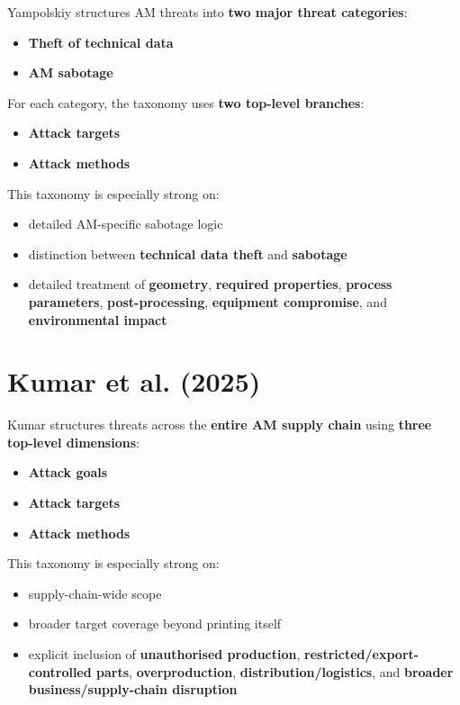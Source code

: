 \documentclass[10pt,a4paper,oneside]{report}
\begin{document}
Yampolskiy structures AM threats into \textbf{two major threat categories}:

\begin{itemize}
\item \textbf{Theft of technical data}
\item \textbf{AM sabotage}
\end{itemize}

For each category, the taxonomy uses \textbf{two top-level branches}:

\begin{itemize}
\item \textbf{Attack targets}
\item \textbf{Attack methods}
\end{itemize}

This taxonomy is especially strong on:

\begin{itemize}
\item detailed AM-specific sabotage logic
\item distinction between \textbf{technical data theft} and \textbf{sabotage}
\item detailed treatment of \textbf{geometry}, \textbf{required properties}, \textbf{process parameters}, \textbf{post-processing}, \textbf{equipment compromise}, and \textbf{environmental impact}
\end{itemize}


\section{Kumar et al. (2025)}


Kumar structures threats across the \textbf{entire AM supply chain} using \textbf{three top-level dimensions}:

\begin{itemize}
\item \textbf{Attack goals}
\item \textbf{Attack targets}
\item \textbf{Attack methods}
\end{itemize}

This taxonomy is especially strong on:

\begin{itemize}
\item supply-chain-wide scope
\item broader target coverage beyond printing itself
\item explicit inclusion of \textbf{unauthorised production}, \textbf{restricted/export-controlled parts}, \textbf{overproduction}, \textbf{distribution/logistics}, and \textbf{broader business/supply-chain disruption}
\end{itemize}
\end{document}
